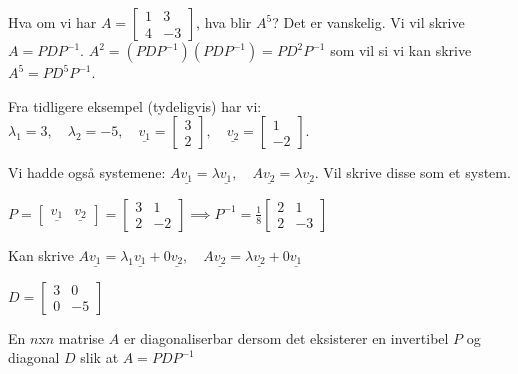 \documentclass[11pt, a4paper, norsk]{article}
\begin{document}
        
        Hva om vi har $A = \begin{bmatrix}
            1 & 3 \\
            4 & -3
        \end{bmatrix}$, hva blir $A^5$? Det er vanskelig. Vi vil skrive $A = PDP^{-1}$. $A^2 = (PDP^{-1})(PDP^{-1}) = PD^2P^{-1}$ som vil si vi kan skrive $A^5 = PD^5P^{-1}$. 

        Fra tidligere eksempel (tydeligvis) har vi:
        $\lambda_1 = 3, \quad \lambda_2 = -5, \quad \underline{v_1} = \begin{bmatrix}
            3 \\
            2
        \end{bmatrix}, \quad \underline{v_2} = \begin{bmatrix}
            1 \\
            -2
        \end{bmatrix}$.

        Vi hadde også systemene: $A\underline{v_1} = \lambda\underline{v_1}, \quad A\underline{v_2} = \lambda\underline{v_2}$. Vil skrive disse som et system.

        $P = \begin{bmatrix}
            \underline{v_1} & \underline{v_2}
        \end{bmatrix} = \begin{bmatrix}
            3 & 1 \\
            2 & -2
        \end{bmatrix} \implies P^{-1} = \frac{1}{8} \begin{bmatrix}
            2 & 1 \\
            2 & -3
        \end{bmatrix}$

        Kan skrive $A\underline{v_1} = \lambda_1\underline{v_1} + 0\underline{v_2}, \quad A\underline{v_2} = \lambda\underline{v_2}+0\underline{v_1}$

        $D = \begin{bmatrix}
            3 & 0 \\
            0 & -5
        \end{bmatrix}$
        
        \begin{Definition}{}{}
            En $n$x$n$ matrise $A$ er diagonaliserbar dersom det eksisterer en invertibel $P$ og diagonal $D$ slik at $A = PDP^{-1}$
        \end{Definition}
        
\end{document}
